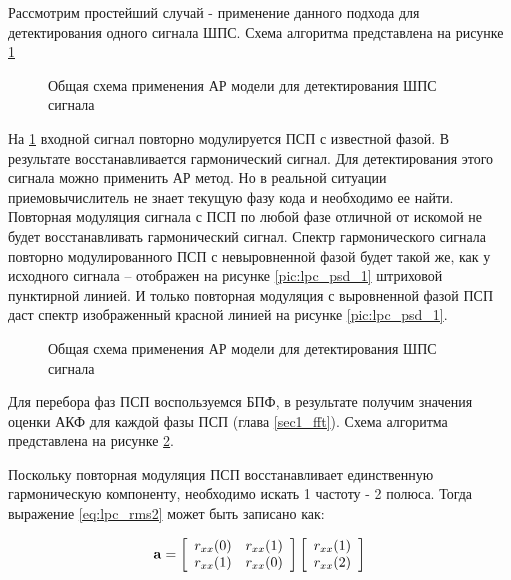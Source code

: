 Рассмотрим простейший случай - применение данного подхода для детектирования одного сигнала ШПС.
Схема алгоритма представлена на рисунке \ref{pic:lpc_basic1}

\begin{figure}[H]
	\center{}
	\caption{Общая схема применения АР модели для детектирования ШПС сигнала}
	\label{pic:lpc_basic1}
\end{figure}

На \ref{pic:lpc_basic1} входной сигнал повторно модулируется ПСП с известной фазой. В результате восстанавливается гармонический сигнал.
Для детектирования этого сигнала можно применить АР метод. Но в реальной ситуации приемовычислитель не знает текущую фазу кода и необходимо ее найти.
Повторная модуляция сигнала с ПСП по любой фазе отличной от искомой не будет восстанавливать гармонический сигнал.
Спектр гармонического сигнала повторно модулированного ПСП с невыровненной фазой будет такой же, как у исходного сигнала – отображен
на рисунке \ref{pic:lpc_psd_1} штриховой пунктирной линией. И только повторная модуляция с выровненной фазой ПСП даст спектр
изображенный красной линией на рисунке \ref{pic:lpc_psd_1}.

\begin{figure}[H]
	\center{}
	\caption{Общая схема применения АР модели для детектирования ШПС сигнала}
	\label{pic:lpc_basic2}
\end{figure}

Для перебора фаз ПСП воспользуемся БПФ, в результате получим значения оценки АКФ для каждой фазы ПСП (глава \ref{sec1_fft}).
Схема алгоритма представлена на рисунке \ref{pic:lpc_basic2}. 

Поскольку повторная модуляция ПСП восстанавливает единственную гармоническую компоненту,
необходимо искать 1 частоту - 2 полюса.  Тогда выражение \ref{eq:lpc_rms2} может быть записано как:
\begin{center}
\begin{equation}
	\label{eq:lpc_gps_1}
	{\bf a} = 
		\left[ \begin{array}{cc}
			r_{xx}(0) & r_{xx}(1) \\
			r_{xx}(1) & r_{xx}(0)
		\end{array} \right]
		\left[ \begin{array}{c}
			r_{xx}(1) \\
			r_{xx}(2)
		\end{array} \right]
\end{equation}
\end{center}

